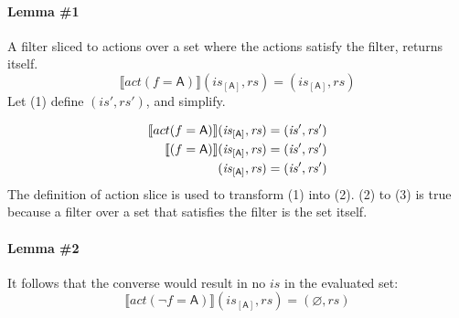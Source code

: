 \documentclass[12pt, letterpaper]{article}
\let\emptyset\varnothing
\newcommand\interp[1]{\llbracket #1 \rrbracket}
\begin{document}
 \paragraph{Lemma \#1}
     A filter sliced to actions over a set where the actions satisfy the filter, returns itself.
 \[
     \interp{ act(f=\mathsf{A}) } (\mathit{is}_{[\mathsf{A}]}, \mathit{rs}) = (\mathit{is_{[\mathsf{A}]}}, \mathit{rs})
 \]
     Let (1) define $(\mathit{is}', \mathit{rs}')$, and simplify.
 \par\nobreak
 {\fontsize{10pt}{12pt}\selectfont
 \begin{align}
     \setcounter{equation}{0}
     \interp{ act(f=\mathsf{A}) } (\mathit{is}_{[\mathsf{A}]}, \mathit{rs})
     &= 
     (\mathit{is}', \mathit{rs}')
     \\
     \interp{ (f=\mathsf{A}) } (\mathit{is}_{[\mathsf{A}]}, \mathit{rs})
     &= 
     (\mathit{is}', \mathit{rs}')
     \\
     (\mathit{is}_{[\mathsf{A}]}, \mathit{rs})
     &= 
     (\mathit{is}', \mathit{rs}')
 \end{align}
 }%
     The definition of action slice is used to transform (1) into (2).  (2) to (3) is true because a filter over a set that satisfies the filter is the set itself.\\
 \paragraph{Lemma \#2}
     It follows that the converse would result in no $\mathit{is}$ in the evaluated set:
 \[
     \interp{ act(\neg f=\mathsf{A}) } (\mathit{is}_{[\mathsf{A}]}, \mathit{rs}) = (\emptyset, \mathit{rs})
 \]
\end{document}
